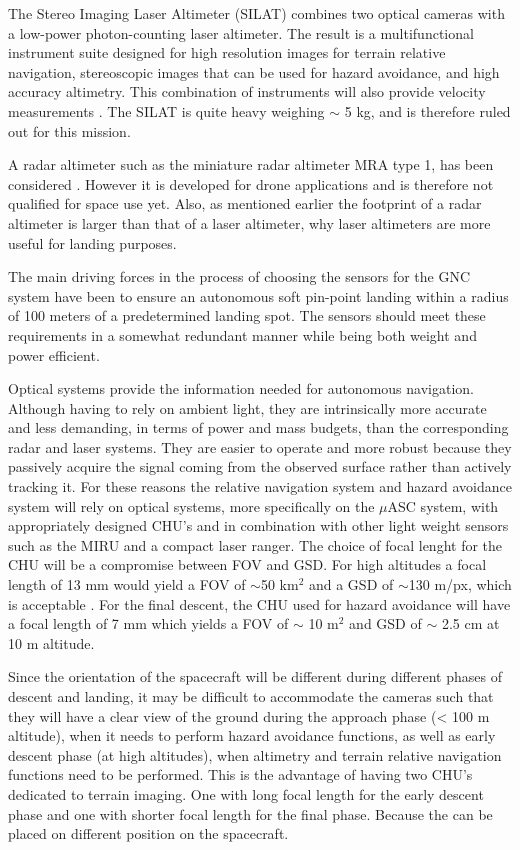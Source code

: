 {The Stereo Imaging Laser Altimeter (SILAT) combines two optical cameras with a low-power photon-counting laser altimeter. The result is a multifunctional instrument suite designed for high resolution images for terrain relative navigation, stereoscopic images that can be used for hazard avoidance, and high accuracy altimetry. This combination of instruments will also provide velocity measurements \citep{SILAT}. The SILAT is quite heavy weighing $\sim$ 5 kg, and is therefore ruled out for this mission.

A radar altimeter such as the miniature radar altimeter MRA type 1, has been considered \cite{http://www.miniradalt.com/mra-type-1.html}. However it is developed for drone applications and is therefore not qualified for space use yet. Also, as mentioned earlier the footprint of a radar altimeter is larger than that of a laser altimeter, why laser altimeters are more useful for landing purposes.  




The main driving forces in the process of choosing the sensors for the GNC system have been to ensure an autonomous soft pin-point landing within a radius of 100 meters of a predetermined landing spot. The sensors should meet these requirements in a somewhat redundant manner while being both weight and power efficient. 

Optical systems provide the information needed for autonomous navigation. Although having to rely on ambient light, they are intrinsically more accurate and less demanding, in terms of power and mass budgets, than the corresponding radar and laser systems. They are easier to operate and more robust because they passively acquire the signal coming from the observed surface rather than actively tracking it. For these reasons the relative navigation system and hazard avoidance system will rely on optical systems, more specifically on the $\mu$ASC system, with appropriately designed CHU's and in combination with other light weight sensors such as the MIRU and a compact laser ranger. The choice of focal lenght for the CHU will be a compromise between FOV and GSD. For high altitudes a focal length of 13 mm would yield a FOV of $\sim$50 km$^2$ and a GSD of $\sim$130 m/px, which is acceptable . For the final descent, the CHU used for hazard avoidance will have a focal length of 7 mm which yields a FOV of $\sim$ 10 m$^2$ and GSD of $\sim$ 2.5 cm at 10 m altitude. 


Since the orientation of the spacecraft will be different during different phases of descent and landing, it may be difficult to accommodate the cameras such that they will have a clear view of the ground during the approach phase (< 100 m altitude), when it needs to perform hazard avoidance functions, as well as early descent phase (at high altitudes), when altimetry and terrain relative navigation functions need to be performed. This is the advantage of having two CHU's dedicated to terrain imaging. One with long focal length for the early descent phase and one with shorter focal length for the final phase. Because the can be placed on different position on the spacecraft.

}
